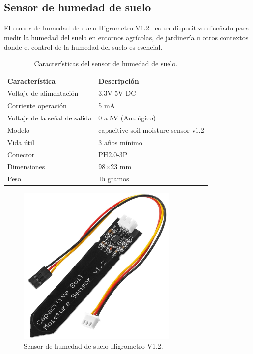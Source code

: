\subsection{Sensor de humedad de suelo}
El sensor de humedad de suelo Higrometro V1.2~\cite{wiki:SensorHumedadSuelo} es un dispositivo diseñado para medir la humedad del suelo en entornos agrícolas, de jardinería u otros contextos donde el control de la humedad del suelo es esencial.

\begin{table}[htbp]
\begin{center}
\caption{Características del sensor de humedad de suelo.}
\begin{tabular}{|l|l|}
\hline
\rowcolor[HTML]{C0C0C0} 
\textbf{Característica} & \textbf{Descripción}\\ \hline
Voltaje de alimentación & 3.3V\quad-\quad5V DC \\ \hline
Corriente operación & 5 mA \\ \hline
Voltaje de la señal de salida & 0 a 5V (Analógico) \\ \hline
Modelo & capacitive soil moisture sensor v1.2 \\ \hline
Vida útil & 3 años mínimo \\ \hline
Conector & PH2.0-3P \\ \hline
Dimensiones & 98$\times$23 mm \\ \hline
Peso & 15 gramos \\ \hline
\end{tabular}
\end{center}
\end{table}

\begin{figure}[h]
    \centering
    \includegraphics[width=0.7\textwidth]{img/herramientas/SensorHumedadSuelo.png}
    \caption{Sensor de humedad de suelo Higrometro V1.2.}
\end{figure}

